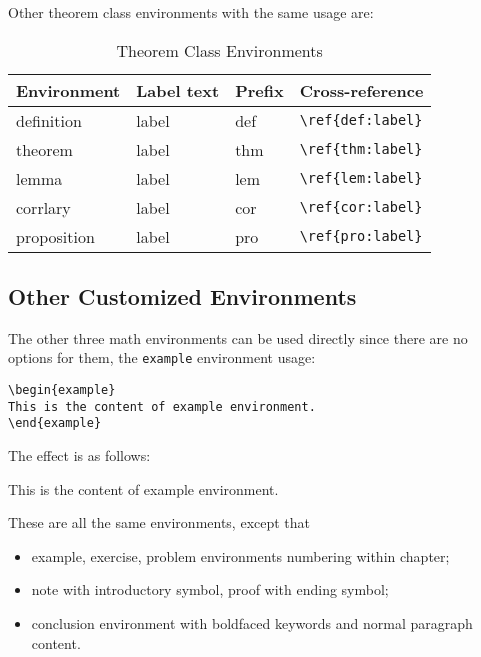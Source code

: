 \documentclass[noanswer,fancy,blue,11pt,hide]{elegantbook}
\begin{document}
Other theorem class environments with the same usage are:

\begin{table}[htbp]
   \centering
   \caption{Theorem Class Environments}
     \begin{tabular}{llll}
     \toprule
     Environment & Label text & Prefix & Cross-reference \\
     \midrule
     definition & label & def   & \lstinline|\ref{def:label}| \\
     theorem & label & thm   & \lstinline|\ref{thm:label}| \\
     lemma & label & lem   & \lstinline|\ref{lem:label}| \\
     corrlary & label & cor   & \lstinline|\ref{cor:label}| \\
     proposition & label & pro   & \lstinline|\ref{pro:label}| \\
     \bottomrule
     \end{tabular}%
   \label{tab:theorem-class}%
 \end{table}%
 

\subsection{Other Customized Environments}
The other three math environments can be used directly since there are no options for them, the \lstinline{example} environment usage:
\begin{lstlisting}
\begin{example}
This is the content of example environment.
\end{example}
\end{lstlisting}

The effect is as follows:

\begin{example}
This is the content of example environment.
\end{example}

These are all the same environments, except that

\begin{itemize}
   \item example, exercise, problem environments numbering within chapter;
   \item note with introductory symbol, proof with ending symbol;
   \item conclusion environment with boldfaced keywords and normal paragraph content.
\end{itemize}
\end{document}
